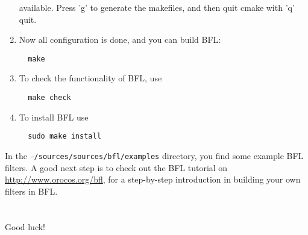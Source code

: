 \documentclass[a4paper,10pt]{article}
\begin{document}
\begin{enumerate}
available. Press 'g' to generate the makefiles, and then quit cmake
with 'q' quit.
\item Now all configuration is done, and you can build BFL:
\begin{verbatim}
  make 
\end{verbatim}	
\item To check the functionality of BFL, use
\begin{verbatim}
  make check
\end{verbatim}	
\item To install BFL use
\begin{verbatim}
  sudo make install
\end{verbatim}
\end{enumerate}
In the \ $\mathtt{\tilde{ }}$\texttt{/sources/sources/bfl/examples} directory, you find some example BFL
filters. A good next step is to check out the BFL tutorial on
\url{http://www.orocos.org/bfl}, for a step-by-step introduction in building
your own filters in BFL.
\\\\\\
Good luck!
\end{document}
